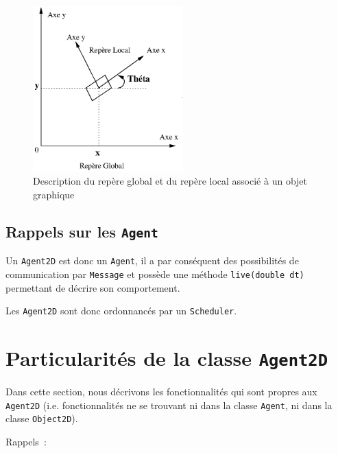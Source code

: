 \documentclass[12pt]{article}
\begin{document}
\begin{figure}[hbtp]
\begin{center}
\includegraphics[width=5.8cm]{fig/reperes}
\end{center}
\caption{Description du rep\`ere global et du rep\`ere local associ\'e
\`a un objet graphique}
\end{figure}

\subsection{Rappels sur les {\tt Agent}}

Un {\tt Agent2D} est donc un {\tt Agent},
il a par cons\'equent des possibilit\'es de communication par {\tt Message}
et poss\`ede une m\'ethode {\tt live(double dt)} permettant de
d\'ecrire son comportement.

\begin{center}
Les {\tt Agent2D} sont donc ordonnanc\'es par un {\tt Scheduler}.
\end{center}


\section{Particularit\'es de la classe {\tt Agent2D}}

Dans cette section, nous d\'ecrivons les fonctionnalit\'es qui
sont propres aux {\tt Agent2D} (i.e. fonctionnalit\'es ne se trouvant
ni dans la classe {\tt Agent}, ni dans la classe {\tt Object2D}).

\vspace{0.3cm}
Rappels~:
\end{document}
